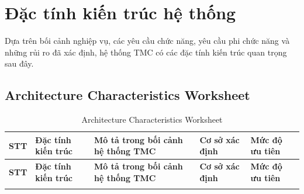 \section{Đặc tính kiến trúc hệ thống}

Dựa trên bối cảnh nghiệp vụ, các yêu cầu chức năng, yêu cầu phi chức năng và những rủi ro đã xác định, hệ thống TMC có các đặc tính kiến trúc quan trọng sau đây.

\subsection{Architecture Characteristics Worksheet}

\small
\renewcommand{\arraystretch}{1.3}
\begin{longtable}{|>{\centering\arraybackslash}p{0.65cm}|>{\raggedright\arraybackslash}p{2.4cm}|>{\raggedright\arraybackslash}p{4.7cm}|>{\raggedright\arraybackslash}p{3.5cm}|>{\centering\arraybackslash}p{1.8cm}|}
\caption{Architecture Characteristics Worksheet}\label{tab:ac-worksheet} \\
\hline
\textbf{STT} & \textbf{Đặc tính kiến trúc} & \textbf{Mô tả trong bối cảnh hệ thống TMC} & \textbf{Cơ sở xác định} & \textbf{Mức độ ưu tiên} \\
\hline
\endfirsthead

\hline
\textbf{STT} & \textbf{Đặc tính kiến trúc} & \textbf{Mô tả trong bối cảnh hệ thống TMC} & \textbf{Cơ sở xác định} & \textbf{Mức độ ưu tiên} \\
\hline
\endhead

\hline
\endfoot

\hline
\endlastfoot


\end{longtable}
